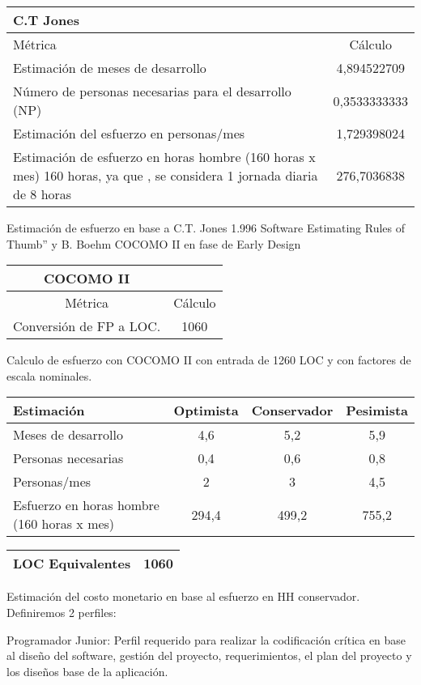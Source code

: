 \begin{longtable}{|p{8cm}|c|}
\hline 
C.T Jones &   \\ 
\hline 
Métrica  & Cálculo \\ 
\hline 
Estimación de meses de desarrollo & 4,894522709 \\ 
\hline 
Número de personas necesarias para el desarrollo (NP) & 0,3533333333 \\ 
\hline 
Estimación del esfuerzo en personas/mes  & 1,729398024 \\ 
\hline 
Estimación de esfuerzo en horas hombre (160 horas x mes) 160 horas, ya que
, se considera 1 jornada diaria de 8 horas & 276,7036838 \\ 
\hline 
\end{longtable} 

Estimación de esfuerzo en base a C.T. Jones 1.996 Software Estimating Rules of Thumb” y B. Boehm COCOMO II en fase de Early Design

\begin{longtable}{|c|c|}
\hline 
COCOMO II &   \\ 
\hline 
Métrica  & Cálculo \\ 
\hline 
Conversión de FP a LOC. & 1060 \\ 
\hline 
\end{longtable}

Calculo de esfuerzo con COCOMO II con entrada de 1260 LOC y con factores de escala nominales.

\begin{longtable}{|p{3cm}|c|c|c|}
 \hline 
 Estimación & Optimista & Conservador & Pesimista \\ 
 \hline 
 Meses de desarrollo & 4,6 & 5,2 & 5,9 \\ 
 \hline 
 Personas necesarias & 0,4 & 0,6 & 0,8 \\ 
 \hline 
 Personas/mes & 2 & 3 & 4,5 \\ 
 \hline 
 Esfuerzo en horas hombre (160 horas x mes) & 294,4 & 499,2 & 755,2 \\ 
 \hline 
 \end{longtable}
 
\begin{longtable}{|c|c|}
  \hline 
  LOC Equivalentes & 1060 \\ 
  \hline 
\end{longtable}

Estimación del costo monetario en base al esfuerzo en HH conservador. Definiremos 2 perfiles:

Programador Junior: Perfil requerido para realizar la codificación crítica en base al diseño del software, gestión del proyecto, requerimientos, el plan del proyecto y los diseños base de la aplicación.

